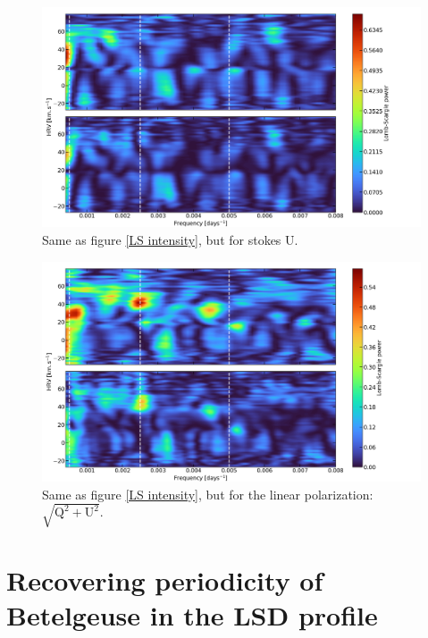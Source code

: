 \documentclass{aa}
\begin{document}
\begin{figure}[!h]
    \centering
    \includegraphics[width=\textwidth]{Lomb-Scargle Stokes U.png}
    \caption{Same as figure \ref{LS intensity}, but for stokes U.}
    \label{LS U}
\end{figure}


\begin{figure}[!h]
    \centering
    \includegraphics[width=\textwidth]{Lomb-Scargle linear polarization.png}
    \caption{Same as figure \ref{LS intensity}, but for the linear polarization: $\sqrt{\mathrm{Q^2}+\mathrm{U^2}}$.}
    \label{LS linear polarization}
\end{figure}



\section{Recovering periodicity of Betelgeuse in the LSD profile}
\end{document}

